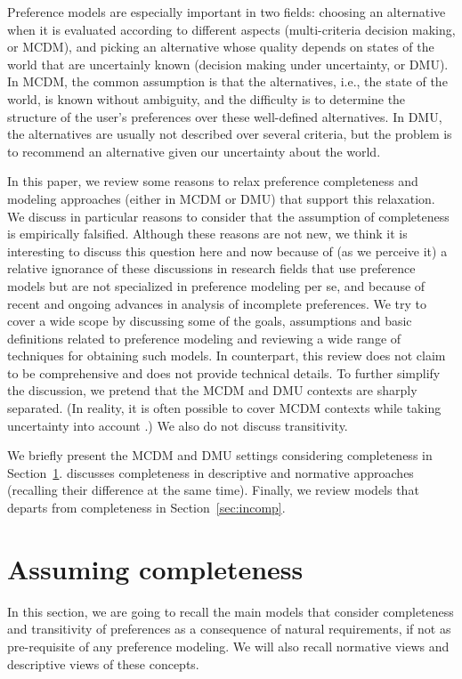 \documentclass[version=last, pagesize, twocolumn, twoside=off, bibliography=totoc, 12pt, a4paper, english]{scrartcl}
\begin{document}
Preference models are especially important in two fields: choosing an alternative when it is evaluated according to different aspects (multi-criteria decision making, or MCDM), and picking an alternative whose quality depends on states of the world that are uncertainly known (decision making under uncertainty, or DMU).
In MCDM, the common assumption is that the alternatives, i.e., the state of the world, is known without ambiguity, and the difficulty is to determine the structure of the user’s preferences over these well-defined alternatives. In DMU, the alternatives are usually not described over several criteria, but the problem is to recommend an alternative given our uncertainty about the world. 
	
In this paper, we review some reasons to relax preference completeness and modeling approaches (either in MCDM or DMU) that support this relaxation. We discuss in particular reasons to consider that the assumption of completeness is empirically falsified. Although these reasons are not new, we think it is interesting to discuss this question here and now because of (as we perceive it) a relative ignorance of these discussions in research fields that use preference models but are not specialized in preference modeling per se, and because of recent and ongoing advances in analysis of incomplete preferences.
We try to cover a wide scope by discussing some of the goals, assumptions and basic definitions related to preference modeling and reviewing a wide range of techniques for obtaining such models. In counterpart, this review does not claim to be comprehensive and does not provide technical details. To further simplify the discussion, we pretend that the MCDM and DMU contexts are sharply separated. (In reality, it is often possible to cover MCDM contexts while taking uncertainty into account \citep{keeney_decisions_1993}.) We also do not discuss transitivity.

We briefly present the MCDM and DMU settings considering completeness in Section~\ref{sec:review}.  discusses completeness in descriptive and normative approaches (recalling their difference at the same time). Finally, we review models that departs from completeness in Section~\ref{sec:incomp}.
	
\section{Assuming completeness}\label{sec:review}
In this section, we are going to recall the main models that consider completeness and transitivity of preferences as a consequence of natural requirements, if not as pre-requisite of any preference modeling. We will also recall normative views and descriptive views of these concepts. 
	
\end{document}
